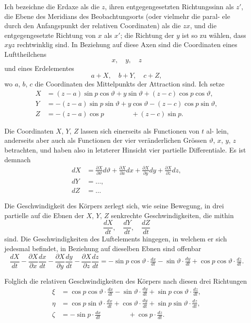 \documentclass[12pt,a4paper]{article}
\begin{document}
Ich bezeichne die Erdaxe als die $z$, ihren entgegengesetzten Richtungssinn 
als $z'$, die Ebene des Meridians des Beobachtungsorts (oder vielmehr die paral-
ele durch den Anfangspunkt der relativen Coordinaten) als die $zx$, und die 
entgegengesetzte Richtung von $x$ als $x'$; die Richtung der $y$ ist so zu wählen, 
dass $xyz$ rechtwinklig sind. In Beziehung auf diese Axen sind die Coordinaten 
eines Lufttheilchens
\[
x,\quad y,\quad z
\]
und eines Erdelementes
\[
a + X,\quad b + Y,\quad c + Z,
\]
wo $a$, $b$, $c$ die Coordinaten des Mittelpunkts der Attraction sind. Ich setze
\begin{align*}
X &= (z-a)\sin p\cos\vartheta + y\sin\vartheta + (z-c)\cos p\cos\vartheta,\\
Y &= -(z-a)\sin p\sin\vartheta + y\cos\vartheta - (z-c)\cos p\sin\vartheta,\\
Z &= -(z-a)\cos p \qquad\qquad + (z-c)\sin p.
\end{align*}

Die Coordinaten $X$, $Y$, $Z$ lassen sich einerseits als Functionen von $t$ al-
lein, anderseits aber auch als Functionen der vier veränderlichen Grössen $\vartheta$, $x$, $y$, $z$ 
betrachten, und haben also in letzterer Hinsicht vier partielle Differentiale. Es 
ist demnach
\begin{align*}
dX &= \tfrac{\partial X}{\partial\vartheta}d\vartheta + \tfrac{\partial X}{\partial x}dx + \tfrac{\partial X}{\partial y}dy + \tfrac{\partial X}{\partial z}dz,\\
dY &= \ldots,\\
dZ &= \ldots
\end{align*}

Die Geschwindigkeit des Körpers zerlegt sich, wie seine Bewegung, in drei 
partielle auf die Ebnen der $X$, $Y$, $Z$ senkrechte Geschwindigkeiten, die mithin
\[
\frac{dX}{dt},\quad \frac{dY}{dt},\quad \frac{dZ}{dt}
\]
sind. Die Geschwindigkeiten des Luftelements hingegen, in welchem er sich 
jedesmal befindet, in Beziehung auf dieselben Ebnen sind offenbar
\[
\frac{dX}{dt} - \frac{\partial X}{\partial x}\frac{dx}{dt} - \frac{\partial X}{\partial y}\frac{dy}{dt} - \frac{\partial X}{\partial z}\frac{dz}{dt} = -\sin p\cos\vartheta\cdot\tfrac{dx}{dt} - \sin\vartheta\cdot\tfrac{dy}{dt} + \cos p\cos\vartheta\cdot\tfrac{dz}{dt}.
\]

Folglich die relativen Geschwindigkeiten des Körpers nach diesen drei Richtungen
\begin{align*}
\xi &= \cos p\cos\vartheta\cdot\tfrac{dx}{dt} - \sin\vartheta\cdot\tfrac{dy}{dt} + \sin p\cos\vartheta\cdot\tfrac{dz}{dt},\\
\eta &= \cos p\sin\vartheta\cdot\tfrac{dx}{dt} + \cos\vartheta\cdot\tfrac{dy}{dt} + \sin p\sin\vartheta\cdot\tfrac{dz}{dt},\\
\zeta &= -\sin p\cdot\tfrac{dx}{dt} \qquad\qquad + \cos p\cdot\tfrac{dz}{dt}.
\end{align*}
\end{document}
